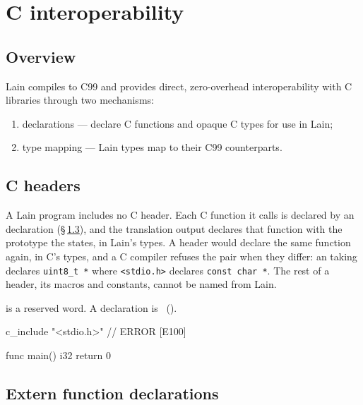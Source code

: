 \chapter{C interoperability}
\label{sec:17-interop}

\section{Overview}
\label{sec:interop.overview}

\pnum
Lain compiles to C99 and provides direct, zero-overhead interoperability
with C libraries through two mechanisms:
\begin{enumerate}
  \item {} declarations --- declare C functions and opaque C types for
        use in Lain;
  \item type mapping --- Lain types map to their C99 counterparts.
\end{enumerate}

\section{C headers}
\label{sec:interop.cinclude}

\pnum
A Lain program includes no C header.  Each C function it calls is declared by an
 declaration (\S\,\ref{sec:interop.extern}), and the translation output
declares that function with the prototype the  states, in Lain's types.
A header would declare the same function again, in C's types, and a C compiler
refuses the pair when they differ: an  taking  declares
\texttt{uint8\_t *} where \texttt{<stdio.h>} declares \texttt{const char *}.  The rest
of a header, its macros and constants, cannot be named from Lain.

\begin{constraint}
   is a reserved word.  A  declaration is
  \illformed{}~().
\end{constraint}

\begin{laincode}
c_include "<stdio.h>"      // ERROR [E100]

func main() i32 {
    return 0
}
\end{laincode}

\section{Extern function declarations}
\label{sec:interop.extern}

